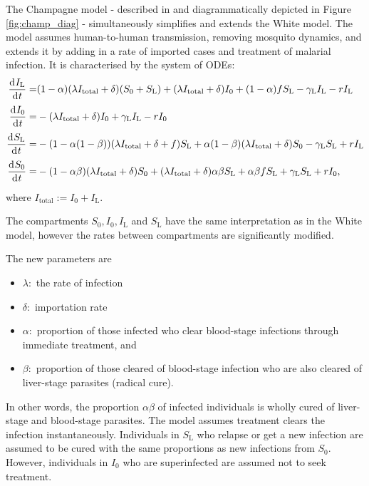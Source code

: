The Champagne model - described in \parencite{champagne_using_2022} and
diagrammatically depicted in Figure \ref{fig:champ_diag} -
simultaneously simplifies and extends the White model. The model assumes 
human-to-human 
transmission, removing mosquito dynamics, and extends it by adding
in a rate of imported cases and treatment of malarial infection.
It is characterised by the system of ODEs:
\begin{align*}
    \frac{\diff I_\mathrm{L}}{\diff t}
    = & (1 - \alpha)(\lambda I_\mathrm{total} + \delta)(S_0 + S_\mathrm{L})
    + (\lambda I_\mathrm{total} + \delta)I_0 + (1 - \alpha)fS_\mathrm{L}
    - \gamma_\mathrm{L}I_\mathrm{L} - rI_\mathrm{L}                         \\
    \frac{\diff I_0}{\diff t}
    = & -(\lambda I_\mathrm{total} + \delta)I_0
    + \gamma_\mathrm{L}I_\mathrm{L} - rI_0                                  \\
    \frac{\diff S_\mathrm{L}}{\diff t}
    = & -(1 - \alpha(1 - \beta))(\lambda I_\mathrm{total} + \delta + f)
    S_\mathrm{L} + \alpha(1-\beta)(\lambda I_\mathrm{total} + \delta)S_0
    - \gamma_\mathrm{L}S_\mathrm{L} + rI_\mathrm{L}                         \\
    \frac{\diff S_0}{\diff t}
    = & -(1 - \alpha\beta)(\lambda I_\mathrm{total} + \delta)S_0
    + (\lambda I_\mathrm{total} + \delta)\alpha\beta S_\mathrm{L}
    + \alpha\beta fS_\mathrm{L} + \gamma_\mathrm{L}S_\mathrm{L} + rI_0,
\end{align*} where $I_\mathrm{total} := I_0 + I_\mathrm{L}.$

The compartments $S_0, I_0, I_\mathrm{L}$ and $S_\mathrm{L}$
have the same interpretation as in the White model,
however the rates between compartments are significantly modified.

The new parameters are
\begin{itemize}
    \item $\lambda:$ the rate of infection
    \item $\delta:$ importation rate
    \item $\alpha:$ proportion of those infected who clear blood-stage
          infections through immediate treatment, and
    \item $\beta:$ proportion of those cleared of blood-stage infection who
          are also cleared of liver-stage parasites (radical cure).
\end{itemize}
In other words, the proportion $\alpha\beta$ of infected individuals is
wholly cured of liver-stage and blood-stage parasites. The model assumes
treatment clears the infection instantaneously. Individuals in $S_\mathrm{L}$ who
relapse or get a new infection are assumed to be cured with the same
proportions as new infections from $S_0.$ However, individuals in $I_0$ who are
superinfected are assumed not to seek treatment.

